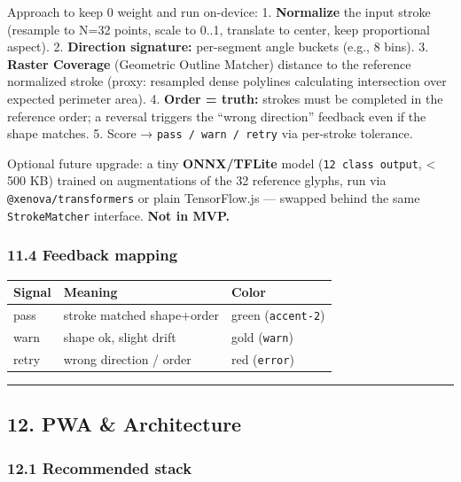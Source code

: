 \documentclass[
  11pt,
]{article}
\begin{document}
Approach to keep 0 weight and run on-device: 1. \textbf{Normalize} the
input stroke (resample to N=32 points, scale to 0..1, translate to
center, keep proportional aspect). 2. \textbf{Direction signature:}
per-segment angle buckets (e.g., 8 bins). 3. \textbf{Raster Coverage}
(Geometric Outline Matcher) distance to the reference normalized stroke
(proxy: resampled dense polylines calculating intersection over expected
perimeter area). 4. \textbf{Order = truth:} strokes must be completed in
the reference order; a reversal triggers the ``wrong direction''
feedback even if the shape matches. 5. Score →
\texttt{pass\ /\ warn\ /\ retry} via per-stroke tolerance.

Optional future upgrade: a tiny \textbf{ONNX/TFLite} model
(\texttt{12\ class\ output}, \textless{} 500 KB) trained on
augmentations of the 32 reference glyphs, run via
\texttt{@xenova/transformers} or plain TensorFlow.js --- swapped behind
the same \texttt{StrokeMatcher} interface. \textbf{Not in MVP.}

\subsubsection{11.4 Feedback mapping}\label{feedback-mapping}

\begin{longtable}[]{@{}lll@{}}
\toprule\noalign{}
Signal & Meaning & Color \\
\midrule\noalign{}
\endhead
\bottomrule\noalign{}
\endlastfoot
pass & stroke matched shape+order & green (\texttt{accent-2}) \\
warn & shape ok, slight drift & gold (\texttt{warn}) \\
retry & wrong direction / order & red (\texttt{error}) \\
\end{longtable}

\begin{center}\rule{0.5\linewidth}{0.5pt}\end{center}

\subsection{12. PWA \& Architecture}\label{pwa-architecture}

\subsubsection{12.1 Recommended stack}\label{recommended-stack}
\end{document}
